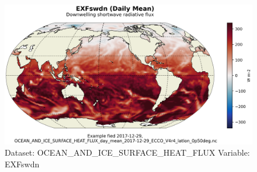 \begin{figure}[H]
\centering
\includegraphics[scale=0.55]{../images/plots/latlon_plots/Ocean_and_Sea-Ice_Surface_Heat_Fluxes/EXFswdn.png}
\caption{Dataset: OCEAN\_AND\_ICE\_SURFACE\_HEAT\_FLUX Variable: EXFswdn}
\label{tab:table-OCEAN_AND_ICE_SURFACE_HEAT_FLUX_EXFswdn-Plot}
\end{figure}
\pagebreak
